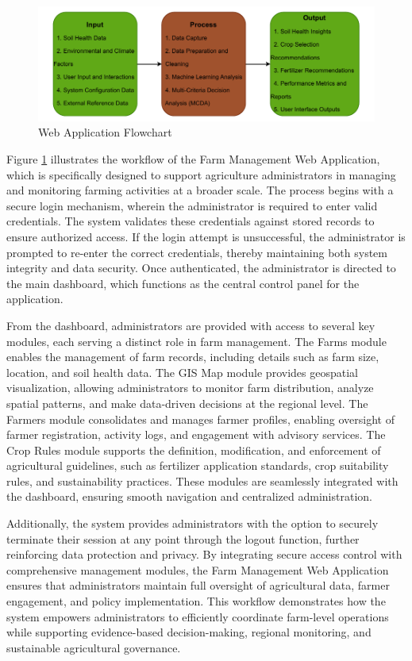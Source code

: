 {	\begin{figure}[H]
		\centering
		\caption{Web Application Flowchart}
		\label{fig:WebFlowchart}
		\includegraphics[width=1\textwidth]{figures/IPO.pdf}
	\end{figure}
	
	Figure \ref{fig:WebFlowchart} illustrates the workflow of the Farm Management Web Application, which is specifically designed to support agriculture administrators in managing and monitoring farming activities at a broader scale. The process begins with a secure login mechanism, wherein the administrator is required to enter valid credentials. The system validates these credentials against stored records to ensure authorized access. If the login attempt is unsuccessful, the administrator is prompted to re-enter the correct credentials, thereby maintaining both system integrity and data security. Once authenticated, the administrator is directed to the main dashboard, which functions as the central control panel for the application.
	
	From the dashboard, administrators are provided with access to several key modules, each serving a distinct role in farm management. The Farms module enables the management of farm records, including details such as farm size, location, and soil health data. The GIS Map module provides geospatial visualization, allowing administrators to monitor farm distribution, analyze spatial patterns, and make data-driven decisions at the regional level. The Farmers module consolidates and manages farmer profiles, enabling oversight of farmer registration, activity logs, and engagement with advisory services. The Crop Rules module supports the definition, modification, and enforcement of agricultural guidelines, such as fertilizer application standards, crop suitability rules, and sustainability practices. These modules are seamlessly integrated with the dashboard, ensuring smooth navigation and centralized administration. 
	
	Additionally, the system provides administrators with the option to securely terminate their session at any point through the logout function, further reinforcing data protection and privacy. By integrating secure access control with comprehensive management modules, the Farm Management Web Application ensures that administrators maintain full oversight of agricultural data, farmer engagement, and policy implementation. This workflow demonstrates how the system empowers administrators to efficiently coordinate farm-level operations while supporting evidence-based decision-making, regional monitoring, and sustainable agricultural governance.
	
}
